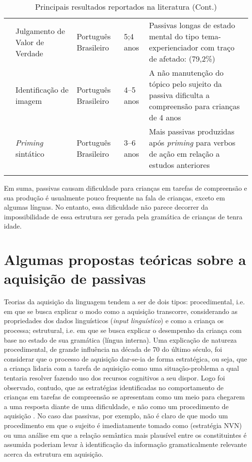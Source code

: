 \documentclass[output=paper]{LSP/langsci}
\begin{document}
\begin{table}[p]
{\begin{tabular}{p{2cm}p{2cm}p{1.5cm}p{1cm}p{5cm}}
\citet{limajunioraugusto2014} & Julgamento de Valor de Verdade             & Português Brasileiro & 5;4 anos       & Passivas longas de estado mental do tipo tema-experienciador com traço de afetado: (79,2\%)       \\
\citet{limajunior2016}           & Identificação de imagem                    & Português Brasileiro & 4--5 anos      & A não manutenção do tópico pelo sujeito da passiva dificulta a compreensão para crianças de 4 anos \\
\citet{limajunior2016}          & \textit{Priming} sintático                 & Português Brasileiro & 3--6 anos      &           Mais passivas produzidas após \textit{priming} para verbos de ação em relação a estudos anteriores \\                                                       \lspbottomrule                                
\end{tabular}}
\caption{Principais resultados reportados na literatura (Cont.)}
\label{tab:correapassiva_correa3}
\end{table}

Em suma, passivas causam dificuldade para crianças em tarefas de compreensão e sua produção é usualmente pouco frequente na fala de crianças, exceto em algumas línguas. No entanto, essa dificuldade não parece decorrer da impossibilidade de essa estrutura ser gerada pela gramática de crianças de tenra idade. 

\section{Algumas propostas teóricas sobre a aquisição de passivas}
\label{sec:correapassiva_algumas_propostas}

Teorias da aquisição da linguagem tendem a ser de dois tipos: procedimental, i.e. em que se busca explicar o modo como a aquisição transcorre, considerando as propriedades dos dados linguísticos (\textit{input linguístico}) e como a criança os processa; estrutural, i.e. em que se busca explicar o desempenho da criança com base no estado de sua gramática (língua interna). Uma explicação de natureza procedimental, de grande influência na década de 70 do último século, foi considerar que o processo de aquisição dar-se-ia de forma estratégica, ou seja, que a criança lidaria com a tarefa de aquisição como uma situação-problema a qual tentaria resolver fazendo uso dos recursos cognitivos a seu dispor. Logo foi observado, contudo, que as estratégias identificadas no comportamento de crianças em tarefas de compreensão se apresentam como um meio para chegarem a uma resposta diante de uma dificuldade, e não como um procedimento de aquisição \citep{cromer1976}. No caso das passivas, por exemplo, não é claro de que modo um procedimento em que o sujeito é imediatamente tomado como  (estratégia NVN) ou uma análise em que a relação semântica mais plausível entre os constituintes é assumida poderiam levar à identificação da informação gramaticalmente relevante acerca da estrutura em aquisição. 
\end{document}
